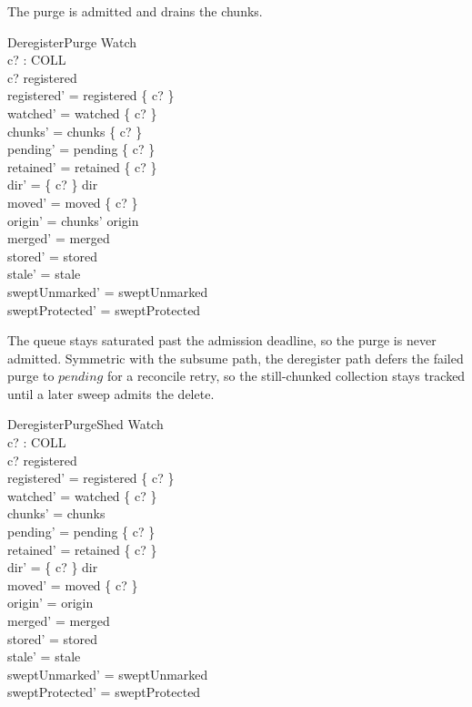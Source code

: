 \documentclass[a4paper]{article}
\begin{document}
The purge is admitted and drains the chunks.

\begin{schema}{DeregisterPurge}
  \Delta Watch \\
  c? : COLL \\
  \where
  c? \in registered \\
  registered' = registered \setminus \{ c? \} \\
  watched' = watched \setminus \{ c? \} \\
  chunks' = chunks \setminus \{ c? \} \\
  pending' = pending \cup \{ c? \} \\
  retained' = retained \setminus \{ c? \} \\
  dir' = \{ c? \} \ndres dir \\
  moved' = moved \setminus \{ c? \} \\
  origin' = chunks' \dres origin \\
  merged' = merged \\
  stored' = stored \\
  stale' = stale \\
  sweptUnmarked' = sweptUnmarked \\
  sweptProtected' = sweptProtected
\end{schema}

The queue stays saturated past the admission deadline, so the purge is never
admitted.  Symmetric with the subsume path, the deregister path defers the
failed purge to $pending$ for a reconcile retry, so the still-chunked collection
stays tracked until a later sweep admits the delete.

\begin{schema}{DeregisterPurgeShed}
  \Delta Watch \\
  c? : COLL \\
  \where
  c? \in registered \\
  registered' = registered \setminus \{ c? \} \\
  watched' = watched \setminus \{ c? \} \\
  chunks' = chunks \\
  pending' = pending \cup \{ c? \} \\
  retained' = retained \setminus \{ c? \} \\
  dir' = \{ c? \} \ndres dir \\
  moved' = moved \setminus \{ c? \} \\
  origin' = origin \\
  merged' = merged \\
  stored' = stored \\
  stale' = stale \\
  sweptUnmarked' = sweptUnmarked \\
  sweptProtected' = sweptProtected
\end{schema}
\end{document}
